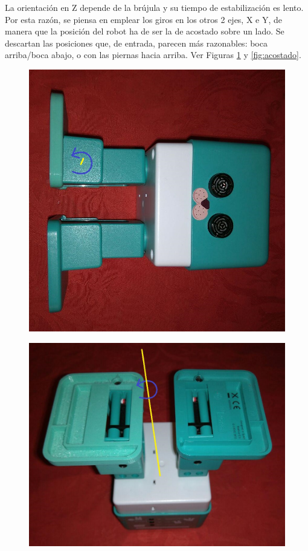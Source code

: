La orientación en Z depende de la brújula y su tiempo de estabilización es lento. Por esta razón, se piensa en emplear los giros en los otros 2 ejes, X e Y, de manera que la posición del robot ha de ser la de acostado sobre un lado. Se descartan las posiciones que, de entrada, parecen más razonables: boca arriba/boca abajo, o con las piernas hacia arriba. Ver Figuras \ref{fig:patas_arriba} y \ref{fig:acostado}.

\begin{figure}
\centering
\begin{minipage}{.5\textwidth}
  \centering
  \includegraphics[width=.9\textwidth]{Figures/acostado}
  \label{fig:acostado}
\end{minipage}%
\begin{minipage}{.5\textwidth}
  \centering
  \includegraphics[width=.9\textwidth]{Figures/patas_arriba}
  \label{fig:patas_arriba}
\end{minipage}
\end{figure}


